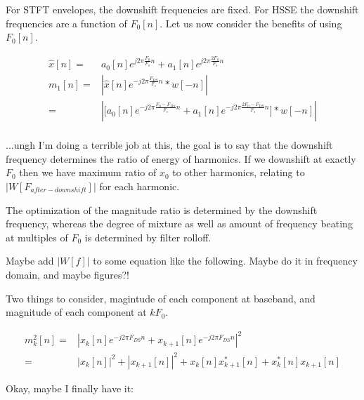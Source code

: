 \documentclass [11pt, proquest] {uwthesis}[2015/03/03]
\begin{document}
For STFT envelopes, the downshift frequencies are fixed.  For HSSE the downshift frequencies are a function of $F_0[n]$.  Let us now consider the benefits of using $F_0[n]$.


\begin{align}
\widehat{x}[n] =& a_0[n] e^{j2\pi \frac{F_0}{F_s} n} + a_1[n] e^{j2\pi \frac{2F_0}{F_s} n} \\
m_1[n] =& | \widehat{x}[n] e^{-j2\pi \frac{F_{DS}}{F_s} n} * w[-n] | \\
=& | \Big[ a_0[n] e^{-j2\pi \frac{F_0 - F_{DS}}{F_s} n} + a_1[n] e^{-j2\pi \frac{2F_0 - F_{DS}}{F_s} n} \Big] * w[-n] | \\
\end{align}

...ungh I'm doing a terrible job at this, the goal is to say that the downshift frequency determines the ratio of energy of harmonics.  If we downshift at exactly $F_0$ then we have maximum ratio of $x_0$ to other harmonics, relating to $|W[F_{after-downshift}]|$ for each harmonic.

The optimization of the magnitude ratio is determined by the downshift frequency, whereas the degree of mixture as well as amount of frequency beating at multiples of $F_0$ is determined by filter rolloff.

Maybe add $|W[f]|$ to some equation like the following.  Maybe do it in frequency domain, and maybe figures?!

Two things to consider, magintude of each component at baseband, and magnitude of each component at $k F_0$.

\begin{align}
m_k^2[n] =& | x_k[n] e^{-j2\pi F_{DS} n} +  x_{k+1}[n] e^{-j2\pi F_{DS} n}|^2 \nonumber \\
=& | x_k[n] |^2 + | x_{k+1}[n] |^2 + x_k[n]x_{k+1}^*[n]  + x_k^*[n]x_{k+1}[n]
\end{align}



Okay, maybe I finally have it:
\end{document}
